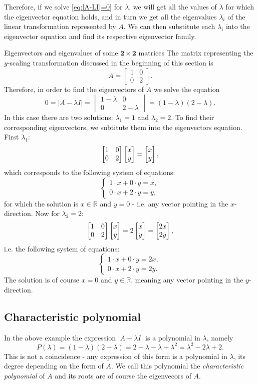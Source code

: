 Therefore, if we solve \autoref{eq:|A-LI|=0} for $\lambda$, we will get all the values of $\lambda$ for which the eigenvector equation holds, and in turn we get all the eigenvalues $\lambda_{i}$ of the linear transformation represented by $A$. We can then substitute each $\lambda_{i}$ into the eigenvector equation and find its respective eigenvector family.

\begin{example}{Eigenvectors and eigenvalues of some $\bm{2\times2}$ matrices}{}
	The matrix representing the $y$-scaling transformation discussed in the beginning of this section is
	\[
		A = \begin{bmatrix}1&0 \\ 0&2\end{bmatrix}.
	\]
	Therefore, in order to find the eigenvectors of $A$ we solve the equation
	\[
		0 = |A-\lambda I| = \begin{vmatrix}1-\lambda & 0 \\ 0 & 2-\lambda\end{vmatrix} = (1-\lambda)(2-\lambda).
	\]
	In this case there are two solutions: $\lambda_{1}=1$ and $\lambda_{2}=2$. To find their corresponding eigenvectors, we subtitute them into the eigenvectors equation. First $\lambda_{1}$:
	\[
		\begin{bmatrix}1&0 \\ 0&2\end{bmatrix}\colvec{x;y} = \colvec{x;y},
	\]
	which corresponds to the following system of equations:
	\[
		\begin{cases}
			1\cdot x + 0\cdot y = x,\\
			0\cdot x + 2\cdot y = y,
		\end{cases}
	\]
	for which the solution is $x\in\mathbb{R}$ and $y=0$ - i.e. any vector pointing in the $x$-direction. Now for $\lambda_{2}=2$:
	\[
		\begin{bmatrix}1&0 \\ 0&2\end{bmatrix}\colvec{x;y} = 2\colvec{x;y} = \colvec{2x;2y},
	\]
	i.e. the following system of equations:
	\[
		\begin{cases}
			1\cdot x + 0\cdot y = 2x,\\
			0\cdot x + 2\cdot y = 2y.
		\end{cases}
	\]
	The solution is of course $x=0$ and $y\in\mathbb{R}$, meaning any vector pointing in the $y$-direction.
\end{example}

\subsection{Characteristic polynomial}
In the above example the expression $|A-\lambda I|$ is a polynomial in $\lambda$, namely
\[
	P(\lambda) = (1-\lambda)(2-\lambda) = 2-\lambda-\lambda+\lambda^{2} = \lambda^{2}-2\lambda+2.
\]
This is not a coincidence - any expression of this form is a polynomial in $\lambda$, its degree depending on the form of $A$. We call this polynomial the \emph{characteristic polynomial} of $A$ and its roots are of course the eigenvecors of $A$.
